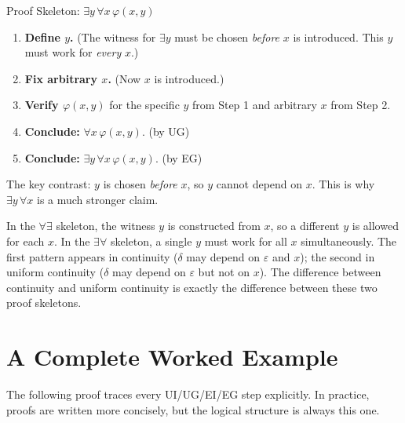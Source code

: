 \begin{propositionbox}{Proof Skeleton: $\exists y\,\forall x\,\varphi(x,y)$}
\begin{enumerate}[label=\textbf{Step \arabic*.}]
\item \textbf{Define $y$.} \quad (The witness for $\exists y$ must be chosen \emph{before}
  $x$ is introduced. This $y$ must work for \emph{every} $x$.)
\item \textbf{Fix arbitrary $x$.} \quad (Now $x$ is introduced.)
\item \textbf{Verify $\varphi(x,y)$} \quad for the specific $y$ from Step 1 and
  arbitrary $x$ from Step 2.
\item \textbf{Conclude:} $\forall x\,\varphi(x,y)$. \quad (by UG)
\item \textbf{Conclude:} $\exists y\,\forall x\,\varphi(x,y)$. \quad (by EG)
\end{enumerate}
The key contrast: $y$ is chosen \emph{before} $x$, so $y$ cannot depend on
$x$. This is why $\exists y\,\forall x$ is a much stronger claim.
\end{propositionbox}

\begin{remark*}
In the $\forall\exists$ skeleton, the witness $y$ is constructed from $x$, so
a different $y$ is allowed for each $x$. In the $\exists\forall$ skeleton, a
single $y$ must work for all $x$ simultaneously. The first pattern appears
in continuity ($\delta$ may depend on $\varepsilon$ and $x$); the second in
uniform continuity ($\delta$ may depend on $\varepsilon$ but not on $x$).
The difference between continuity and uniform continuity is exactly the
difference between these two proof skeletons.
\end{remark*}


\section*{A Complete Worked Example}

\begin{exposition}
The following proof traces every UI/UG/EI/EG step explicitly. In practice,
proofs are written more concisely, but the logical structure is always this one.
\end{exposition}

